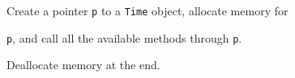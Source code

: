 Create a pointer \texttt{p} to a \texttt{Time} object, allocate memory for

\texttt{p}, and call all the available methods through \texttt{p}.

Deallocate memory at the end.

